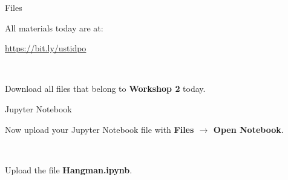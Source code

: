 \documentclass[dvipsnames, svgnames, x11names]{beamer}
\begin{document}
\begin{frame}[fragile]{Files}
    \begin{center}
        All materials today are at:

        \href{https://bit.ly/ustidpo}{https://bit.ly/ustidpo}

        \


        Download all files that belong to \textbf{Workshop 2} today.
    \end{center}
\end{frame}

\begin{frame}[fragile]{Jupyter Notebook}
    \begin{center}
        Now upload your Jupyter Notebook file with \textbf{Files $\rightarrow$ Open Notebook}.
    
        \


        Upload the file \textbf{Hangman.ipynb}.
    
    \end{center}
\end{frame}
\end{document}
